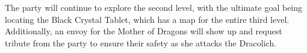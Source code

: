 The party will continue to explore the second level, with the ultimate goal being locating the Black Crystal Tablet, which has a map for the entire third level.
Additionally, an envoy for the Mother of Dragons will show up and request tribute from the party to ensure their safety as she attacks the Dracolich.
